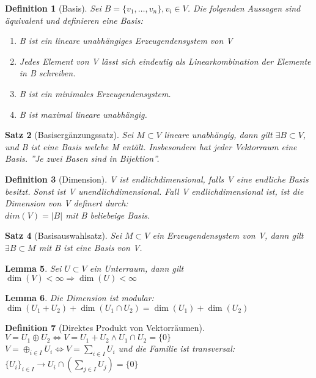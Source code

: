 \documentclass{report}
\theoremstyle{customrem}
\theoremstyle{customdef}
\newtheorem{definition}{Definition}[chapter]
\newtheorem{lemma}[definition]{Lemma}
\newtheorem{satz}[definition]{Satz}
\theoremstyle{customenv}
\begin{document}
\begin{definition}[Basis]
  Sei \(B = \{v_1, \dots, v_n\}, v_i \in V\).
  Die folgenden Aussagen sind \"aquivalent und definieren eine Basis:
  \begin{enumerate}
    \item{B ist ein lineare unabh\"angiges Erzeugendensystem von V}
    \item{
      Jedes Element von V l\"asst sich eindeutig als Linearkombination der
      Elemente in B schreiben.
    }
    \item{B ist ein minimales Erzeugendensystem.}
    \item{B ist maximal lineare unabh\"angig.}
  \end{enumerate}
\end{definition}

\begin{satz}[Basiserg\"anzungssatz]
  Sei \(M \subset V\) lineare unabh\"angig, dann gilt \( \exists B \subset V\),
  und B ist eine Basis welche M ent\"alt. Insbesondere hat jeder Vektorraum eine
  Basis. ''Je zwei Basen sind in Bijektion''.
\end{satz}

\begin{definition}[Dimension]  
  V ist endlichdimensional, falls V eine endliche Basis besitzt. Sonst ist V
  unendlichdimensional. Fall V endlichdimensional ist, ist die Dimension von V
  definert durch:\\
  \(dim(V) = |B|\) mit B beliebeige Basis.
\end{definition}

\begin{satz}[Basisauswahlsatz]
  Sei \(M \subset V\) ein Erzeugendensystem von V, dann gilt
  \(\exists B \subset M\) mit B ist eine Basis von V.
\end{satz}

\begin{lemma}
  Sei \(U \subset V\) ein Unterraum, dann gilt
  \(\dim(V) < \infty \Rightarrow \dim(U) < \infty\)
\end{lemma}

\begin{lemma}
  Die Dimension ist modular:
  \(\dim(U_1 + U_2) + \dim(U_1 \cap U_2) = \dim(U_1) + \dim(U_2)\)
\end{lemma}

\begin{definition}[Direktes Produkt von Vektorr\"aumen]
  \(
  V = U_1 \oplus U_2 \Leftrightarrow V = U_1 + U_2 \land U_1 \cap U_2 = \{0\}
  \)\\
  \(V = \oplus_{i \in I} U_i \Leftrightarrow V = \sum_{i \in I} U_i \) und die
  Familie ist transversal:
  \(\{U_i\}_{i \in I} \to U_i \cap (\sum_{j \in I} U_j) = \{0\}\)
\end{definition}
\end{document}
